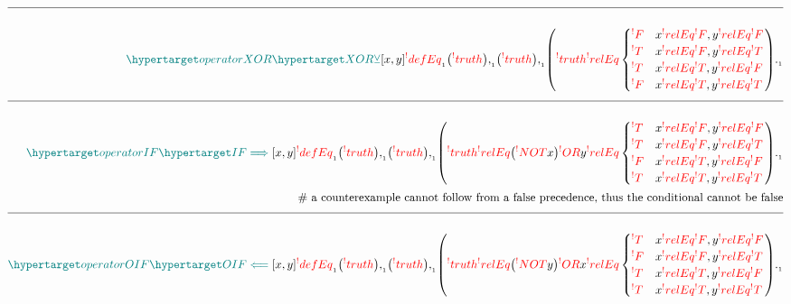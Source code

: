 \documentclass[a4paper]{article}
\makeatletter
\newcommand\rfrlist[1]{\forcsvlist{\rfrlist@item}{#1}}
\newcommand\rfrlist@item[1]{\rfr{#1}\\}
\newcommand{\thmlink}[2]{{}_{\substack{\rfrlist{#1}}}^{\dfn{#2}}}
\newcommand{\eqComment}[1]{\text{  \# #1}}
\newcommand{\n}{\\[1.5ex] \hline \nonumber \\[0ex]}
\newcommand{\m}{\nonumber \\}
\def\ml{\mleft}
\def\mr{\mright}
\newcommand{\cusand}{,}
\newcommand{\cusend}{.}
\newcommand{\cusnum}[2]{{#1}_{{\phantom{ }}_{#2}}}
\makeatother
\begin{document}
\begin{tcolorbox}
\begin{align}
    \n \dfn{operatorXOR} [\dfn{XOR}[\veebar]][x, y] \cusnum{\rfr{defEq}}{1} \ml(\rfr{truth} [x][]\mr) \cusnum{\cusand}{1} \ml(\rfr{truth} [y][]\mr) \cusnum{\cusand}{1} \ml(\rfr{truth} [x \rfr{XOR} y][] \rfr{relEq} \begin{cases} \rfr{F} & x \rfr{relEq} \rfr{F} \cusand y \rfr{relEq} \rfr{F} \\ \rfr{T} & x \rfr{relEq} \rfr{F} \cusand y \rfr{relEq} \rfr{T} \\ \rfr{T} & x \rfr{relEq} \rfr{T} \cusand y \rfr{relEq} \rfr{F} \\ \rfr{F} & x \rfr{relEq} \rfr{T} \cusand y \rfr{relEq} \rfr{T} \end{cases}\mr) \cusnum{\cusend}{1}
    \n \dfn{operatorIF} [\dfn{IF}[\implies]][x, y] \cusnum{\rfr{defEq}}{1} \ml(\rfr{truth} [x][]\mr) \cusnum{\cusand}{1} \ml(\rfr{truth} [y][]\mr) \cusnum{\cusand}{1} \ml(\rfr{truth} [x \rfr{IF} y][] \rfr{relEq} \ml(\rfr{NOT} x\mr) \rfr{OR} y \rfr{relEq} \begin{cases} \rfr{T} & x \rfr{relEq} \rfr{F} \cusand y \rfr{relEq} \rfr{F} \\ \rfr{T} & x \rfr{relEq} \rfr{F} \cusand y \rfr{relEq} \rfr{T} \\ \rfr{F} & x \rfr{relEq} \rfr{T} \cusand y \rfr{relEq} \rfr{F} \\ \rfr{T} & x \rfr{relEq} \rfr{T}\cusand y \rfr{relEq} \rfr{T} \end{cases}\mr) \cusnum{\cusend}{1}
\m \eqComment{a counterexample cannot follow from a false precedence, thus the conditional cannot be false}
    \n \dfn{operatorOIF} [\dfn{OIF}[\impliedby]][x, y] \cusnum{\rfr{defEq}}{1} \ml(\rfr{truth} [x][]\mr) \cusnum{\cusand}{1} \ml(\rfr{truth} [y][]\mr) \cusnum{\cusand}{1} \ml(\rfr{truth} [x \rfr{OIF} y][] \rfr{relEq} \ml(\rfr{NOT} y\mr) \rfr{OR} x \rfr{relEq} \begin{cases} \rfr{T} & x \rfr{relEq} \rfr{F} \cusand y \rfr{relEq} \rfr{F} \\ \rfr{F} & x \rfr{relEq} \rfr{F} \cusand y \rfr{relEq} \rfr{T} \\ \rfr{T} & x \rfr{relEq} \rfr{T} \cusand y \rfr{relEq} \rfr{F} \\ \rfr{T} & x \rfr{relEq} \rfr{T} \cusand y \rfr{relEq} \rfr{T} \end{cases}\mr) \cusnum{\cusend}{1}

\end{align}
\end{tcolorbox}
\end{document}
